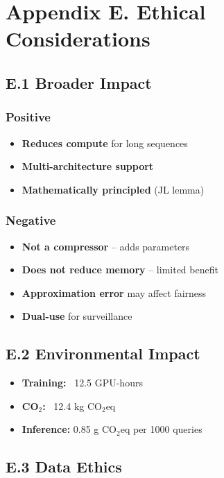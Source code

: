 
\section{Appendix E. Ethical Considerations}

\subsection{E.1 Broader Impact}

\subsubsection{Positive}
\begin{itemize}
\item \textbf{Reduces compute} for long sequences
\item \textbf{Multi-architecture support}
\item \textbf{Mathematically principled} (JL lemma)

\end{itemize}
\subsubsection{Negative}
\begin{itemize}
\item \textbf{Not a compressor} -- adds parameters
\item \textbf{Does not reduce memory} -- limited benefit
\item \textbf{Approximation error} may affect fairness
\item \textbf{Dual-use} for surveillance

\end{itemize}
\subsection{E.2 Environmental Impact}

\begin{itemize}
\item \textbf{Training:} ~12.5 GPU-hours
\item \textbf{CO$_2$:} ~12.4 kg CO$_2$eq
\item \textbf{Inference:} 0.85 g CO$_2$eq per 1000 queries

\end{itemize}
\subsection{E.3 Data Ethics}

